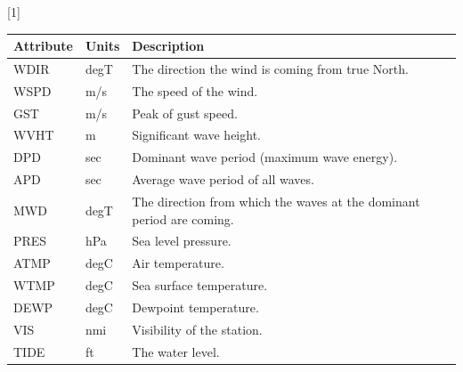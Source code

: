 \documentclass[energies,article,accept,moreauthors,pdftex]{Definitions/mdpi}
\begin{document}
\begin{itemize}
\begin{specialtable}[H]
				\setlength{\cellWidtha}{\columnwidth/3-2\tabcolsep-1.2in}
\setlength{\cellWidthb}{\columnwidth/3-2\tabcolsep-1.2in}
\setlength{\cellWidthc}{\columnwidth/3-2\tabcolsep+2.4in}
\scalebox{1}[1]{\begin{tabularx}{\columnwidth}{>{\PreserveBackslash\centering}m{\cellWidtha}>{\PreserveBackslash\centering}m{\cellWidthb}>{\PreserveBackslash\raggedright}m{\cellWidthc}}
\toprule
					
					\textbf{Attribute}&\textbf{Units}&\textbf{Description}\\
 
					\midrule
					
					WDIR & degT & The direction the wind is coming from true North. \\ \midrule
					
					WSPD &  m/s & The speed of the wind. \\ \midrule
					
					GST &  m/s & Peak of gust speed. \\ \midrule
					
					WVHT &  m &  Significant wave height. \\ \midrule
					
					DPD & sec & Dominant wave period (maximum wave energy). \\ \midrule
					
					APD &  sec & Average wave period of all waves. \\ \midrule
					
					MWD & degT & The direction from which the waves at the dominant period are coming. \\ \midrule
					
					PRES &  hPa &  Sea level pressure. \\ \midrule
					
					ATMP & degC & Air temperature. \\ \midrule
					
					WTMP &  degC & Sea surface temperature.\\ \midrule
					
					DEWP & degC & Dewpoint temperature. \\ \midrule
					
					VIS &  nmi &  Visibility of the station. \\ \midrule
					
					TIDE & ft & The water level. \\
					
					\bottomrule
						

\end{tabularx}}
\end{specialtable}
\end{itemize}
\end{document}
